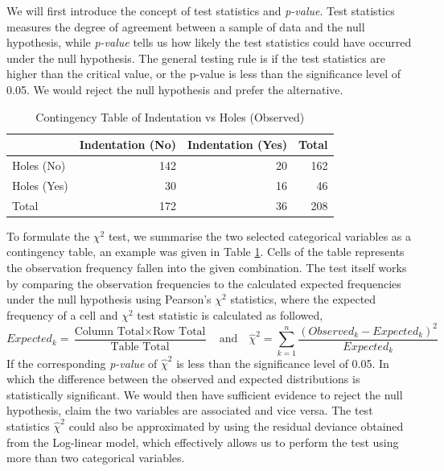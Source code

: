 \documentclass[11pt, oneside]{article}
\begin{document}
\noindent We will first introduce the concept of test statistics and \textit{p-value}. Test statistics measures the degree of agreement between a sample of data and the null hypothesis, while \textit{p-value} tells us how likely the test statistics could have occurred under the null hypothesis. The general testing rule is if the test statistics are higher than the critical value, or the p-value is less than the significance level of 0.05. We would reject the null hypothesis and prefer the alternative.

\begin{table}[H]
\begin{center}
\begin{tabular}{lrrr}
\hline
& Indentation (No) & Indentation (Yes) & Total \\
\hline
Holes (No) & 142 & 20 & 162 \\
Holes (Yes) & 30 & 16 &  46 \\
\hline
Total & 172 & 36 & 208 \\
\hline
\end{tabular}
\end{center}
\caption{Contingency Table of Indentation vs Holes (Observed)}
\label{indent-holes}
\end{table}

\noindent To formulate the $\chi^2$ test, we summarise the two selected categorical variables as a contingency table, an example was given in Table \ref{indent-holes}. Cells of the table represents the observation frequency fallen into the given combination. The test itself works by comparing the observation frequencies to the calculated expected frequencies under the null hypothesis using Pearson's $\chi^2$ statistics, where the expected frequency of a cell and $\chi^2$ test statistic is calculated as followed,
\begin{equation*}
    Expected_k = \frac{\text{Column Total} \times \text{Row Total}}{\text{Table Total}} \quad\text{and}\quad
    \hat{\chi}^2=\sum_{k=1}^{n} \frac{(Observed_k - Expected_k)^2}{Expected_k}
\end{equation*}
If the corresponding \textit{p-value} of $\hat{\chi}^2$ is less than the significance level of 0.05. In which the difference between the observed and expected distributions is statistically significant. We would then have sufficient evidence to reject the null hypothesis, claim the two variables are associated and vice versa. The test statistics $\hat{\chi}^2$ could also be approximated by using the residual deviance obtained from the Log-linear model, which effectively allows us to perform the test using more than two categorical variables.
\end{document}
